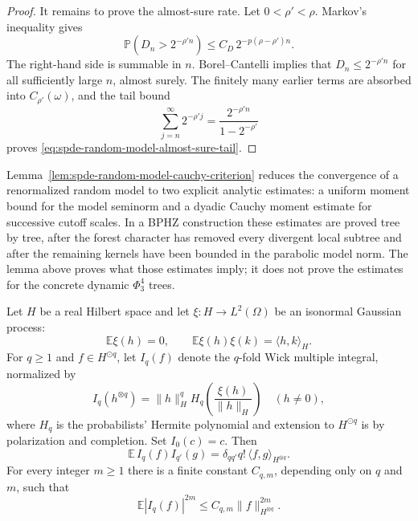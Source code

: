 \begin{proof}
It remains to prove the almost-sure rate.  Let \(0<\rho'<\rho\).  Markov's
inequality gives
\[
  \mathbb P(D_n>2^{-\rho'n})
  \leq
  C_D\,2^{-p(\rho-\rho')n}.
\]
The right-hand side is summable in \(n\).  Borel--Cantelli implies that
\(D_n\leq2^{-\rho'n}\) for all sufficiently large \(n\), almost surely.
The finitely many earlier terms are absorbed into \(C_{\rho'}(\omega)\), and
the tail bound
\[
  \sum_{j=n}^{\infty}2^{-\rho'j}
  =
  \frac{2^{-\rho'n}}{1-2^{-\rho'}}
\]
proves \eqref{eq:spde-random-model-almost-sure-tail}.
\end{proof}

Lemma~\ref{lem:spde-random-model-cauchy-criterion} reduces the convergence
of a renormalized random model to two explicit analytic estimates: a uniform
moment bound for the model seminorm and a dyadic Cauchy moment estimate for
successive cutoff scales.  In a BPHZ construction these estimates are proved
tree by tree, after the forest character has removed every divergent local
subtree and after the remaining kernels have been bounded in the parabolic
model norm.  The lemma above proves what those estimates imply; it does
not prove the estimates for the concrete dynamic \(\Phi^4_3\) trees.

\begin{lemma}
\label{lem:spde-finite-wiener-chaos-moment-bound}
Let \(H\) be a real Hilbert space and let
\(\xi:H\to L^2(\Omega)\) be an isonormal Gaussian process:
\[
  \mathbb E\xi(h)=0,\qquad
  \mathbb E\xi(h)\xi(k)=\langle h,k\rangle_H .
\]
For \(q\geq1\) and \(f\in H^{\odot q}\), let \(I_q(f)\) denote the
\(q\)-fold Wick multiple integral, normalized by
\[
  I_q(h^{\otimes q})
  =
  \|h\|_H^q
  H_q\!\left(\frac{\xi(h)}{\|h\|_H}\right)
  \quad(h\neq0),
\]
where \(H_q\) is the probabilists' Hermite polynomial and extension to
\(H^{\odot q}\) is by polarization and completion.  Set \(I_0(c)=c\).  Then
\begin{equation}
  \mathbb E\,I_q(f)I_{q'}(g)
  =
  \delta_{q q'}q!\,\langle f,g\rangle_{H^{\otimes q}} .
  \label{eq:spde-wiener-chaos-isometry}
\end{equation}
For every integer \(m\geq1\) there is a finite constant \(C_{q,m}\),
depending only on \(q\) and \(m\), such that
\begin{equation}
  \mathbb E|I_q(f)|^{2m}
  \leq
  C_{q,m}\|f\|_{H^{\otimes q}}^{2m}.
  \label{eq:spde-wiener-chaos-even-moment-bound}
\end{equation}
\end{lemma}

